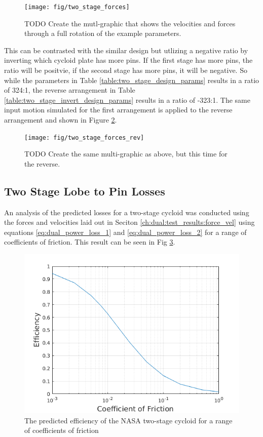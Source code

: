 \begin{figure}[h]
	\centering
	\texttt{[image: fig/two\_stage\_forces]}
   \caption{TODO Create the mutl-graphic that shows the velocities and forces through a full rotation of the example parameters.}
   \label{fig:two_stage_forces}
\end{figure}

This can be contrasted with the similar design but utlizing a negative ratio by inverting which cycloid plate has more pins. If the first stage has more pins, the ratio will be positvie, if the second stage has more pins, it will be negative. So while the parameters in Table \ref{table:two_stage_design_params} results in a ratio of 324:1, the reverse arrangement in Table \ref{table:two_stage_invert_design_params} results in a ratio of -323:1. The same input motion simulated for the first arrangement is applied to the reverse arrangement and shown in Figure \ref{fig:two_stage_forces_rev}.

\begin{figure}[h]
	\centering
	\texttt{[image: fig/two\_stage\_forces\_rev]}
   \caption{TODO Create the same multi-graphic as above, but this time for the reverse.}
   \label{fig:two_stage_forces_rev}
\end{figure}

\subsection{Two Stage Lobe to Pin Losses} \label{ch:dual:test_results:losses}

An analysis of the predicted losses for a two-stage cycloid was conducted using the forces and velocities laid out in Seciton \ref{ch:dual:test_results:force_vel} using equations \ref{eq:dual_power_loss_1} and \ref{eq:dual_power_loss_2} for a range of coefficients of friction. This result can be seen in Fig \ref{fig:two_stage_as_designed}.

\begin{figure}[h]
	\centering
	\includegraphics[width=0.75\linewidth]{fig/two_stage_as_designed}
   \caption{The predicted efficiency of the NASA two-stage cycloid for a range of coefficients of friction}
   \label{fig:two_stage_as_designed}
\end{figure}

